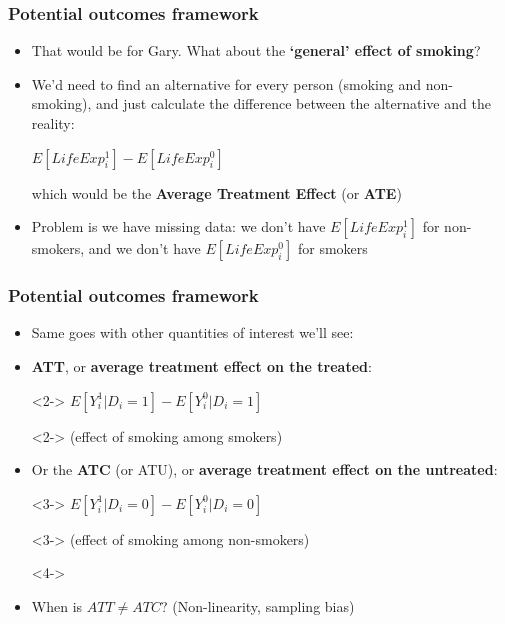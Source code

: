 \documentclass[aspectratio=43]{beamer}
\begin{document}
\begin{frame}
\frametitle{Potential outcomes framework}
\centering

\begin{itemize}
  \item That would be for Gary. What about the \textbf{`general' effect of smoking}?
  \item We'd need to find an alternative for every person (smoking and non-smoking), and just calculate the difference between the alternative and the reality:
  \item[] $E[LifeExp_{i}^{1}] - E[LifeExp_{i}^{0}]$
  \item[] which would be the \textbf{Average Treatment Effect} (or \textbf{ATE})
  \item<2-> Problem is we have missing data: we don't have $E[LifeExp_{i}^{1}]$ for non-smokers, and we don't have $E[LifeExp_{i}^{0}]$ for smokers
\end{itemize}

\end{frame}

\begin{frame}
\frametitle{Potential outcomes framework}
\centering

\begin{itemize}
  \item<1-> Same goes with other quantities of interest we'll see:
  \item<2-> \textbf{ATT}, or \textbf{average treatment effect on the treated}:
  \item[]<2-> $E[Y_{i}^{1}|D_{i} = 1] - E[Y_{i}^{0}|D_{i} = 1]$
  \item[]<2-> {\small (effect of smoking among smokers)}
  \item<3-> Or the \textbf{ATC} (or ATU), or \textbf{average treatment effect on the untreated}:
  \item[]<3-> $E[Y_{i}^{1}|D_{i} = 0] - E[Y_{i}^{0}|D_{i} = 0]$
  \item[]<3-> {\small (effect of smoking among non-smokers)}
  \item[]<4->
  \item<4-> When is $ATT \neq ATC$? {\footnotesize (Non-linearity, sampling bias)}
\end{itemize}

\end{frame}
\end{document}
